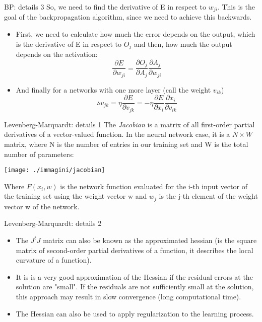 \begin{frame}{BP: details 3}
So, we need to find the derivative of E in respect to $w_{ji}$. This is the goal of the backpropagation algorithm, since we need to achieve this backwards. 
\begin{itemize}
\item First, we need to calculate how much the error depends on the output, which is the derivative of E in respect to $O_{j}$ and then, how much the output depends on the activation: 
\begin{equation}
\frac{\partial E}{\partial w_{ji}}=\frac{\partial O_{j}}{\partial A_{j}}\frac{\partial A_{j}}{\partial w_{ji}} 
\end{equation}
\item And finally for a networks with one more layer (call the weight $v_{ik}$)
\begin{equation}
\vartriangle v_{jk}=\eta\frac{\partial E}{\partial v_{jk}}=-\eta\frac{\partial E}{\partial x_{i}}\frac{\partial x_{i}}{\partial v_{ik}}
\end{equation}
\end{itemize}
\end{frame}
\begin{frame}{Levenberg-Marquardt: details 1}
The \textit{Jacobian} is a matrix of all first-order partial derivatives of a vector-valued function. In the neural network case, it is a $N \times W$ matrix, where N is the number of entries in our training set and W is the total number of parameters:
\begin{center}
 \texttt{[image: ./immagini/jacobian]}
\end{center}
Where $F(x_{i}, w)$ is the network function evaluated for the i-th input vector of the training set using the weight vector w and $w_{j}$ is the j-th element of the weight vector w of the network.
\end{frame}
\begin{frame}{Levenberg-Marquardt: details 2}
\begin{itemize}
\item  The $J^{t}J$ matrix can also be known as the approximated hessian (is the square matrix of second-order partial derivatives of a function, it describes the local curvature of a function). 
\item It is is a very good approximation of the Hessian if the residual errors at the solution are "small". If the residuals are not sufficiently small at the solution, this approach may result in slow convergence (long computational time). 
\item The Hessian can also be used to apply regularization to the learning process. 
\end{itemize}
\end{frame}
